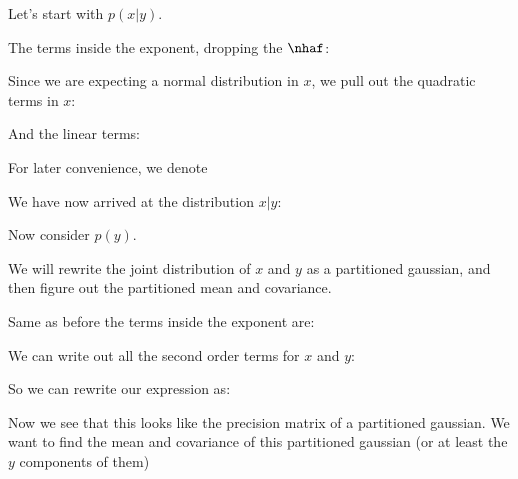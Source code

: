 \documentclass[12pt]{article}
\begin{document}

Let's start with $p(x|y)$.


The terms inside the exponent, dropping the $\nhaf$:


Since we are expecting a normal distribution in $x$, we pull out the quadratic terms in $x$:


And the linear terms:


For later convenience, we denote


We have now arrived at the distribution $x|y$:


Now consider $p(y)$. 


We will rewrite the joint distribution of $x$ and $y$ as a partitioned gaussian, and then figure out the partitioned mean and covariance.

Same as before the terms inside the exponent are:


We can write out all the second order terms for $x$ and $y$:


So we can rewrite our expression as:


Now we see that this looks like the precision matrix of a partitioned gaussian. We want to find the mean and covariance of this partitioned gaussian (or at least the $y$ components of them)
\end{document}
